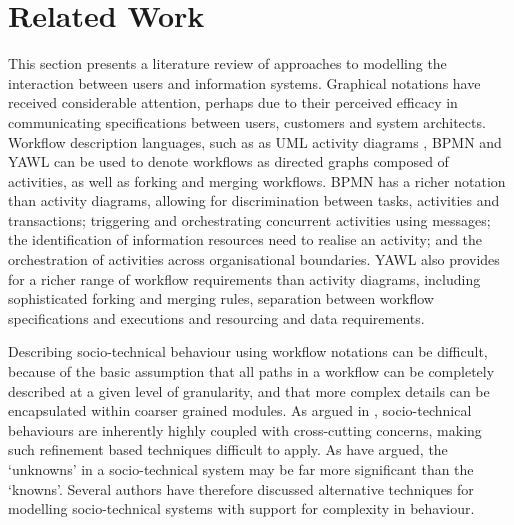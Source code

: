 \documentclass{llncs}
\begin{document}

\section{Related Work}
\label{sec:related}


This section presents a literature review of approaches to modelling the interaction between users and information
systems.  Graphical notations have received considerable attention, perhaps due to their perceived efficacy in
communicating specifications between users, customers and system architects.  Workflow description languages, such as as
UML activity diagrams \citep{omg07omguml}, BPMN \citep{omg2011omgbpmn} and YAWL \citep{hofstede2010yawl} can be used to
denote workflows as directed graphs composed of activities, as well as forking and merging workflows.  BPMN has a richer
notation than activity diagrams, allowing for discrimination between tasks, activities and transactions; triggering and
orchestrating concurrent activities using messages; the identification of information resources need to realise an
activity; and the orchestration of activities across organisational boundaries. YAWL also provides for a richer range of
workflow requirements than activity diagrams, including sophisticated forking and merging rules, separation between
workflow specifications and executions and resourcing and data requirements.

Describing socio-technical behaviour using workflow notations can be difficult, because of the basic assumption that all
paths in a workflow can be completely described at a given level of granularity, and that more complex details can be
encapsulated within coarser grained modules.  As argued in , socio-technical behaviours are
inherently highly coupled with cross-cutting concerns, making such refinement based techniques difficult to apply.  As
\citet{israilidis13ignorance} have argued, the `unknowns' in a socio-technical system may be far more significant than
the `knowns'. Several authors have therefore discussed alternative techniques for modelling socio-technical systems with
support for complexity in behaviour.
\end{document}
